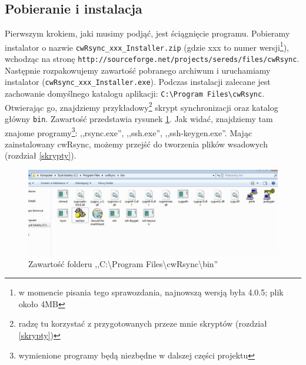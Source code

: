 \subsection{Pobieranie i instalacja}
\label{mini}
Pierwszym krokiem, jaki musimy podjąć, jest ściągnięcie programu. Pobieramy instalator o nazwie \verb|cwRsync_xxx_Installer.zip| (gdzie xxx to numer wersji\footnote{w momencie pisania tego sprawozdania, najnowszą wersją była 4.0.5; plik około 4MB}), wchodząc na stronę \verb|http://sourceforge.net/projects/sereds/files/cwRsync|. Następnie rozpakowujemy zawartość pobranego archiwum i uruchamiamy instalator (\verb|cwRsync_xxx_Installer.exe|). Podczas instalacji zalecane jest zachowanie domyślnego katalogu aplikacji: \verb|C:\Program Files\cwRsync|. Otwierając go, znajdziemy przykładowy\footnote{radzę tu korzystać z przygotowanych przeze mnie skryptów (rozdział \ref{skrypty})} skrypt synchronizacji oraz katalog główny \verb|bin|. Zawartość przedstawia rysunek \ref{bin}. Jak widać, znajdziemy tam znajome programy\footnote{wymienione programy będą niezbędne w dalszej części projektu}: ,,rsync.exe'', ,,ssh.exe'', ,,ssh-keygen.exe''. Mając zainstalowany cwRsync, możemy przejść do tworzenia plików wsadowych (rozdział \ref{skrypty}).
\begin{figure}[h!]
	\centering
	\includegraphics[width=1\textwidth]{img/i3.jpeg}
	\caption{Zawartość folderu ,,C:\textbackslash Program Files\textbackslash cwRsync\textbackslash bin''}
	\label{bin}
\end{figure}

